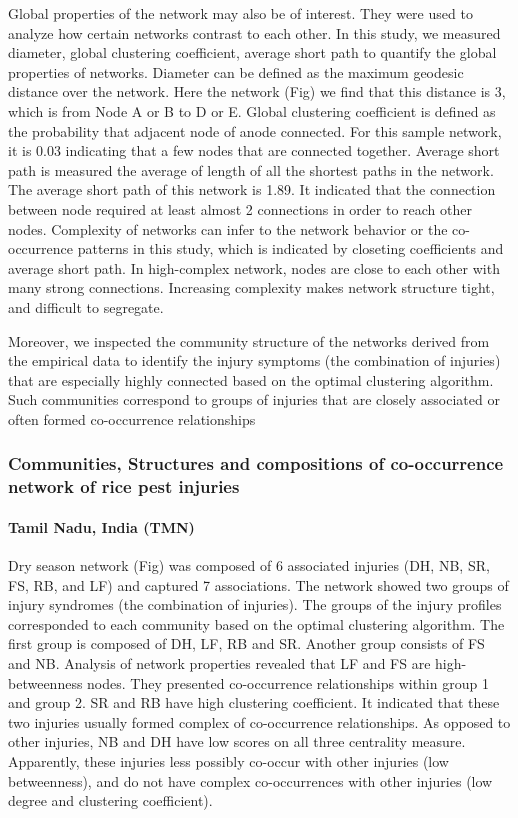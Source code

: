 Global properties of the network may also be of interest. They were used to analyze how certain networks contrast to each other. In this study, we measured diameter, global clustering coefficient, average short path to quantify the global properties of networks.  Diameter can be defined as the maximum geodesic distance over the network. Here the network (Fig) we find that this distance is 3, which is from Node A or B to D or E. Global clustering coefficient is defined as the probability that adjacent node of anode connected. For this sample network, it is 0.03 indicating that a few nodes that are connected together. Average short path is measured the average of length of all the shortest paths in the network. The average short path of this network is 1.89. It indicated that the connection between node required at least almost 2 connections in order to reach other nodes. Complexity of networks can infer to the network behavior or the co-occurrence patterns in this study, which is indicated by closeting coefficients and average short path. In high-complex network, nodes are close to each other with many strong connections. Increasing complexity makes network structure tight, and difficult to segregate.   

Moreover, we inspected the community structure of the networks derived from the empirical data to identify the injury symptoms (the combination of injuries) that are especially highly connected based on the optimal clustering algorithm. Such communities correspond to groups of injuries that are closely associated or often formed co-occurrence relationships

\subsubsection{Communities, Structures and compositions of co-occurrence network of rice pest injuries}
\paragraph{Tamil Nadu, India (TMN)}

Dry season network (Fig) was composed of 6 associated injuries (DH, NB, SR, FS, RB, and LF) and captured 7 associations. The network showed two groups of injury syndromes (the combination of injuries). The groups of the injury profiles corresponded to each community based on the optimal clustering algorithm. The first group is composed of DH, LF, RB and SR. Another group consists of FS and NB. Analysis of network properties revealed that LF and FS are high-betweenness nodes. They presented co-occurrence relationships within group 1 and group 2. SR and RB have high clustering coefficient. It indicated that these two injuries usually formed complex of co-occurrence relationships. As opposed to other injuries, NB and DH have low scores on all three centrality measure. Apparently, these injuries less possibly co-occur with other injuries (low betweenness), and do not have complex co-occurrences with other injuries (low degree and clustering coefficient).

